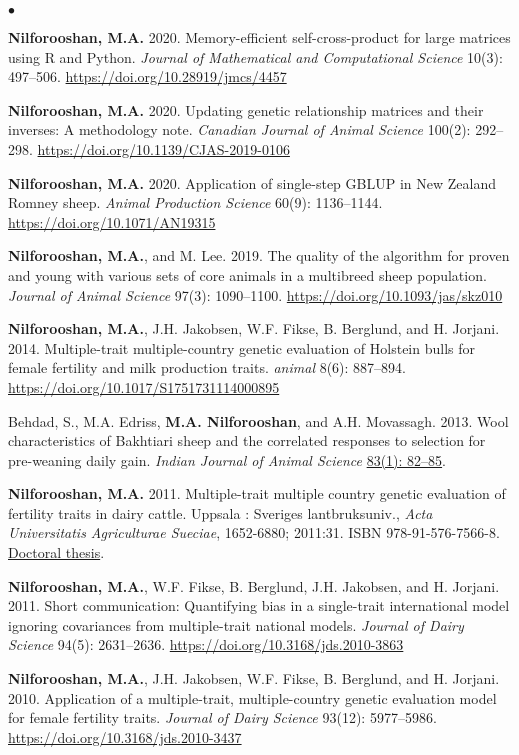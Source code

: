 \documentclass[margin,line]{res}
\newenvironment{list2}{
  \begin{list}{$\bullet$}{%
      \setlength{\itemsep}{0in}
      \setlength{\parsep}{0in} \setlength{\parskip}{0in}
      \setlength{\topsep}{0in} \setlength{\partopsep}{0in}
      \setlength{\leftmargin}{0.2in}}}{\end{list}}
\begin{document}
\begin{resume}
\begin{list2}
    \item {\bf Nilforooshan, M.A.} 2020. Memory-efficient self-cross-product for large matrices using R and Python. {\em Journal of Mathematical and Computational Science} 10(3): 497--506. \url{https://doi.org/10.28919/jmcs/4457}
    \item {\bf Nilforooshan, M.A.} 2020. Updating genetic relationship matrices and their inverses: A methodology note. {\em Canadian Journal of Animal Science} 100(2): 292--298. \url{https://doi.org/10.1139/CJAS-2019-0106}
    \item {\bf Nilforooshan, M.A.} 2020. Application of single-step GBLUP in New Zealand Romney sheep. {\em Animal Production Science} 60(9): 1136--1144. \url{https://doi.org/10.1071/AN19315}
    \item {\bf Nilforooshan, M.A.}, and M. Lee. 2019. The quality of the algorithm for proven and young with various sets of core animals in a multibreed sheep population. {\em Journal of Animal Science} 97(3): 1090--1100. \url{https://doi.org/10.1093/jas/skz010}
    \item {\bf Nilforooshan, M.A.}, J.H. Jakobsen, W.F. Fikse, B. Berglund, and H. Jorjani. 2014. Multiple-trait multiple-country genetic evaluation of Holstein bulls for female fertility and milk production traits. {\em animal} 8(6): 887--894. \url{https://doi.org/10.1017/S1751731114000895}
    \item Behdad, S., M.A. Edriss, {\bf M.A. Nilforooshan}, and A.H. Movassagh. 2013. Wool characteristics of Bakhtiari sheep and the correlated responses to selection for pre-weaning daily gain. {\em Indian Journal of Animal Science} \href{http://epubs.icar.org.in/ejournal/index.php/IJAnS/article/view/26453}{83(1): 82--85}.
    \item {\bf Nilforooshan, M.A.} 2011. Multiple-trait multiple country genetic evaluation of fertility traits in dairy cattle. Uppsala : Sveriges lantbruksuniv., {\em Acta Universitatis Agriculturae Sueciae}, 1652-6880; 2011:31. ISBN 978-91-576-7566-8. \href{https://res.slu.se/id/publ/33755}{Doctoral thesis}.
    \item {\bf Nilforooshan, M.A.}, W.F. Fikse, B. Berglund, J.H. Jakobsen, and H. Jorjani. 2011. Short communication: Quantifying bias in a single-trait international model ignoring covariances from multiple-trait national models. {\em Journal of Dairy Science} 94(5): 2631--2636. \url{https://doi.org/10.3168/jds.2010-3863}
    \item {\bf Nilforooshan, M.A.}, J.H. Jakobsen, W.F. Fikse, B. Berglund, and H. Jorjani. 2010. Application of a multiple-trait, multiple-country genetic evaluation model for female fertility traits. {\em Journal of Dairy Science} 93(12): 5977--5986. \url{https://doi.org/10.3168/jds.2010-3437}

\end{list2}
\end{resume}
\end{document}
